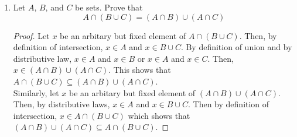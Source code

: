 \documentclass{article}
\begin{document}
\begin{enumerate}
\begin{flushleft}
\begin{enumerate}
				\item Is it true that $(A \setminus B^\mathsf{c}) = (A^\mathsf{c} \setminus B^\mathsf{c})$?
				\\ \vspace{1.5mm} 
				To disprove the statement, a counter example will be provided. Suppose $A$, $B$, and C are arbitary but fixed sets in a universe $U$. Let $U = \{1, 2, 3, 4\}$ and $A = \{1\}$, $B = \{2\}$, and $C = \{1, 2, 3\}$. Then $(A \setminus B^\mathsf{c}) = \{3, 4\} $ while $ (A^\mathsf{c} \setminus B^\mathsf{c}) = \{2\}$. As a result, from the counter example, we can see that $(A \setminus B^\mathsf{c}) \neq (A^\mathsf{c} \setminus B^\mathsf{c})$.
			\end{enumerate}
		\end{flushleft}
		\textbf{\textit{Question to Ponder: 2}}
		\begin{flushleft}
			Prove that $\sqrt{3}$ is irrational.
			\begin{proof}
				By contradiction, assume to the contary that there exists a rational number $x$ whose square equals to 3. By definition of rational number, there exists two integers $m, n$ such that $x = \frac{m}{n}$ without loss of generality assume m, n are relatively prime. Thus $(\frac{m}{n})^2 = 3$ and can be rewrite as $m^2 = 3n^2$ which says that m can be divided by 3 ($3 \mid m$). But then $3 \mid m$ means that there exists an integer $k$ such that $m = 3k$. Then, by substituting $m$ with $3k$, $(3k)^2 = 3n^2$ which is equivalent to $9k^2 = 3n^2$. Since both $9k^2$ and $3n^2$ can be divided by 3, this contradicts ous assumptions that $m$ and $n$ has no common factor. Therefore, there does not exist a rational number whose square equals to 3.
			\end{proof}
		\end{flushleft}
		\textbf{\textit{2.4.4}}
		\setcounter{enumi}{1}
		\item 
		\begin{flushleft}
			Let $A$, $B$, and $C$ be sets. Prove that
			\[A \cap (B \cup C) = (A \cap B) \cup (A \cap C)\]
			\begin{proof}
				Let $x$ be an arbitary but fixed element of $A \cap (B \cup C)$. Then, by definition of intersection, $x \in A$ and $x \in B \cup C$. By definition of union and by distributive law, $x \in A$ and $x \in B$ or $x \in A$ and $x \in C$. Then, $x \in (A \cap B) \cup (A \cap C)$. This shows that $A \cap (B \cup C) \subseteq (A \cap B) \cup (A \cap C)$.
				\\ \vspace{1mm} 
				Similarly, let $x$ be an arbitary but fixed element of $(A \cap B) \cup (A \cap C)$. Then, by distributive laws, $x \in A$ and $x \in B \cup C$. Then by definition of intersection, $x \in A \cap (B \cup C)$ which shows that $(A \cap B) \cup (A \cap C) \subseteq A \cap (B \cup C)$.
				

\end{proof}
\end{flushleft}
\end{enumerate}
\end{document}
